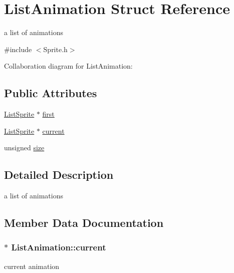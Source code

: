 \hypertarget{structListAnimation}{}\section{List\+Animation Struct Reference}
\label{structListAnimation}


a list of animations  




{\ttfamily \#include $<$Sprite.\+h$>$}



Collaboration diagram for List\+Animation\+:
\subsection*{Public Attributes}
\begin{DoxyCompactItemize}
\item 
\hyperlink{structListSprite}{List\+Sprite} $\ast$ \hyperlink{structListAnimation_a10e6ec29763c73d4e86c6f2e826745a0}{first}
\item 
\hyperlink{structListSprite}{List\+Sprite} $\ast$ \hyperlink{structListAnimation_a183b3118dc9a28773848b0ec8c60fc19}{current}
\item 
unsigned \hyperlink{structListAnimation_a445c07a71a57e1e9ff7312bea9e98f8e}{size}
\end{DoxyCompactItemize}


\subsection{Detailed Description}
a list of animations 

\subsection{Member Data Documentation}
\subsubsection[{\texorpdfstring{current}{current}}]{$\ast$ List\+Animation\+::current}\hypertarget{structListAnimation_a183b3118dc9a28773848b0ec8c60fc19}{}\label{structListAnimation_a183b3118dc9a28773848b0ec8c60fc19}
current animation 
